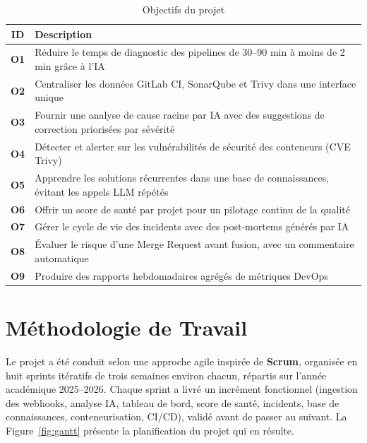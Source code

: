 \documentclass[12pt,a4paper,oneside]{report}
\begin{document}
\begin{table}[H]\centering
\caption{Objectifs du projet}\label{tab:objectives}
\renewcommand{\arraystretch}{1.3}
\begin{tabularx}{\textwidth}{>{\bfseries\color{primary}}c Y}
\toprule
{} ID & Description \\
\midrule
O1 & Réduire le temps de diagnostic des pipelines de 30--90 min à moins de 2 min grâce à l'IA \\
O2 & Centraliser les données GitLab CI, SonarQube et Trivy dans une interface unique \\
O3 & Fournir une analyse de cause racine par IA avec des suggestions de correction priorisées par sévérité \\
O4 & Détecter et alerter sur les vulnérabilités de sécurité des conteneurs (CVE Trivy) \\
O5 & Apprendre les solutions récurrentes dans une base de connaissances, évitant les appels LLM répétés \\
O6 & Offrir un score de santé par projet pour un pilotage continu de la qualité \\
O7 & Gérer le cycle de vie des incidents avec des post-mortems générés par IA \\
O8 & Évaluer le risque d'une Merge Request avant fusion, avec un commentaire automatique \\
O9 & Produire des rapports hebdomadaires agrégés de métriques DevOps \\
\bottomrule
\end{tabularx}
\end{table}

\section{Méthodologie de Travail}\label{sec:workingmethodology}
Le projet a été conduit selon une approche agile inspirée de \textbf{Scrum}, organisée en huit sprints itératifs de trois semaines environ chacun, répartis sur l'année académique 2025--2026. Chaque sprint a livré un incrément fonctionnel (ingestion des webhooks, analyse IA, tableau de bord, score de santé, incidents, base de connaissances, conteneurisation, CI/CD), validé avant de passer au suivant. La Figure~\ref{fig:gantt} présente la planification du projet qui en résulte.
\end{document}
